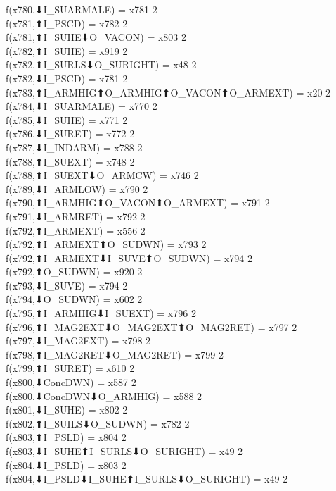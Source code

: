 f(x780,⬇I_SUARMALE) = x781 {2} \\
f(x781,⬆I_PSCD) = x782 {2} \\
f(x781,⬆I_SUHE⬇O_VACON) = x803 {2} \\
f(x782,⬆I_SUHE) = x919 {2} \\
f(x782,⬆I_SURLS⬇O_SURIGHT) = x48 {2} \\
f(x782,⬇I_PSCD) = x781 {2} \\
f(x783,⬆I_ARMHIG⬆O_ARMHIG⬆O_VACON⬆O_ARMEXT) = x20 {2} \\
f(x784,⬇I_SUARMALE) = x770 {2} \\
f(x785,⬇I_SUHE) = x771 {2} \\
f(x786,⬇I_SURET) = x772 {2} \\
f(x787,⬇I_INDARM) = x788 {2} \\
f(x788,⬆I_SUEXT) = x748 {2} \\
f(x788,⬆I_SUEXT⬇O_ARMCW) = x746 {2} \\
f(x789,⬇I_ARMLOW) = x790 {2} \\
f(x790,⬆I_ARMHIG⬆O_VACON⬆O_ARMEXT) = x791 {2} \\
f(x791,⬇I_ARMRET) = x792 {2} \\
f(x792,⬆I_ARMEXT) = x556 {2} \\
f(x792,⬆I_ARMEXT⬆O_SUDWN) = x793 {2} \\
f(x792,⬆I_ARMEXT⬇I_SUVE⬆O_SUDWN) = x794 {2} \\
f(x792,⬆O_SUDWN) = x920 {2} \\
f(x793,⬇I_SUVE) = x794 {2} \\
f(x794,⬇O_SUDWN) = x602 {2} \\
f(x795,⬆I_ARMHIG⬇I_SUEXT) = x796 {2} \\
f(x796,⬆I_MAG2EXT⬇O_MAG2EXT⬆O_MAG2RET) = x797 {2} \\
f(x797,⬇I_MAG2EXT) = x798 {2} \\
f(x798,⬆I_MAG2RET⬇O_MAG2RET) = x799 {2} \\
f(x799,⬆I_SURET) = x610 {2} \\
f(x800,⬇ConcDWN) = x587 {2} \\
f(x800,⬇ConcDWN⬇O_ARMHIG) = x588 {2} \\
f(x801,⬇I_SUHE) = x802 {2} \\
f(x802,⬆I_SUILS⬇O_SUDWN) = x782 {2} \\
f(x803,⬆I_PSLD) = x804 {2} \\
f(x803,⬇I_SUHE⬆I_SURLS⬇O_SURIGHT) = x49 {2} \\
f(x804,⬇I_PSLD) = x803 {2} \\
f(x804,⬇I_PSLD⬇I_SUHE⬆I_SURLS⬇O_SURIGHT) = x49 {2} \\
